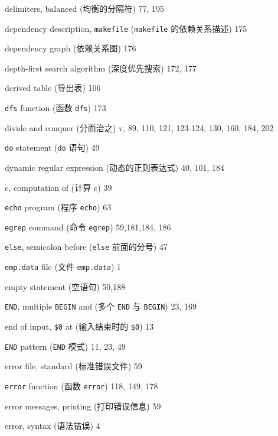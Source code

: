 \begin{multicols}{2}
\hangindent=2pc  delimiters, balanced (均衡的分隔符) 77, 195

\hangindent=2pc  dependency description, \verb'makefile'
(\verb'makefile' 的依赖关系描述) 175

\hangindent=2pc  dependency graph (依赖关系图) 176

\hangindent=2pc  depth-first search algorithm (深度优先搜索) 172, 177

\hangindent=2pc  derived table (导出表) 106

\hangindent=2pc  \verb'dfs' function (函数 \verb'dfs') 173

\hangindent=2pc  divide and conquer (分而治之) v, 89, 110, 121, 123-124, 130, 160, 184, 202

\hangindent=2pc  \verb'do' statement (\verb'do' 语句) 49

\hangindent=2pc  dynamic regular expression (动态的正则表达式) 40,  101, 184

\hangindent=2pc  $e$, computation of (计算 $e$) 39

\hangindent=2pc  \verb'echo' program (程序 \verb'echo') 63

\hangindent=2pc  \verb'egrep' command (命令 \verb'egrep') 59,181,184, 186

\hangindent=2pc  \verb'else', semicolon before (\verb'else'
前面的分号) 47

\hangindent=2pc  \verb'emp.data' file (文件 \verb'emp.data') 1

\hangindent=2pc  empty statement (空语句) 50,188

\hangindent=2pc  \verb'END', multiple \verb'BEGIN' and (多个
\verb'END' 与 \verb'BEGIN') 23, 169

\hangindent=2pc  end of input, \verb'$0' at (输入结束时的
\verb'$0') 13

\hangindent=2pc  \verb'END' pattern (\verb'END' 模式) 11, 23, 49

\hangindent=2pc  error file, standard (标准错误文件) 59

\hangindent=2pc  \verb'error' function (函数 \verb'error')
118, 149, 178

\hangindent=2pc  error messages, printing (打印错误信息) 59

\hangindent=2pc  error, syntax (语法错误) 4


\end{multicols}
